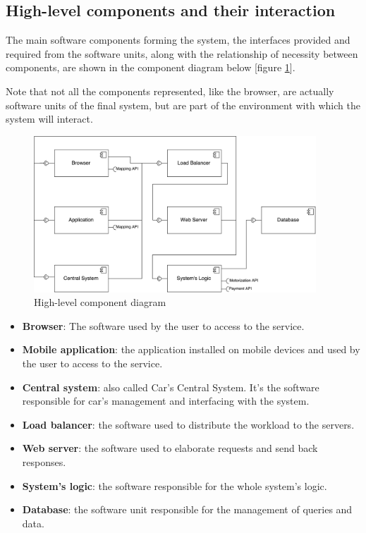 \subsection{High-level components and their interaction}

The main software components forming the system, the interfaces provided and required from the software units, along with the relationship of necessity between components, are shown in the component diagram below [figure \ref{fig:high-lev-comp-diag}].

Note that not all the components represented, like the browser, are actually software units of the final system, but are part of the environment with which the system will interact.

\begin{figure}[h]
	\centerline{
		\includegraphics[width=400px]{../Datas/images/high-level-component-diagram.pdf}
	}
	\caption{High-level component diagram}
	\label{fig:high-lev-comp-diag}
\end{figure}

\begin{itemize}
	\item \textbf{Browser}: The software used by the user to access to the service.
	\item \textbf{Mobile application}: the application installed on mobile devices and used by the user to access to the service.
	\item \textbf{Central system}: also called Car's Central System. It's the software responsible for car's management and interfacing with the system.
	\item \textbf{Load balancer}: the software used to distribute the workload to the servers.
	\item \textbf{Web server}: the software used to elaborate requests and send back responses.
	\item \textbf{System's logic}: the software responsible for the whole system's logic.
	\item \textbf{Database}: the software unit responsible for the management of queries and data.
\end{itemize}
